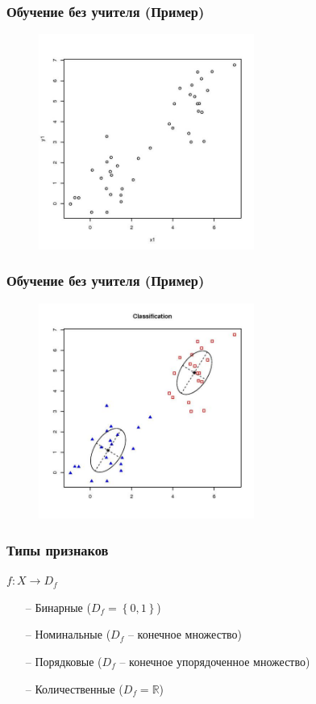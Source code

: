 \documentclass[12pt]{beamer}
\begin{document}
\begin{frame}\frametitle{Обучение без учителя (Пример) }
\begin{figure}[htbp]
\centering
\includegraphics[height=200pt]{Clustering1}  
\end{figure}
\end{frame}

\begin{frame}\frametitle{Обучение без учителя (Пример) }
\begin{figure}[htbp]
\centering
\includegraphics[height=200pt]{Clustering2}  
\end{figure}
\end{frame}

\begin{frame}\frametitle{Типы признаков}
${f: X \rightarrow D_f}$
\begin{itemize}
  \item[--] Бинарные (${D_f = \left\{ 0, 1 \right\} }$)
  \item[--] Номинальные (${D_f}$ -- конечное множество)
  \item[--] Порядковые (${D_f}$ -- конечное упорядоченное множество)
  \item[--] Количественные (${D_f = \mathbb{R} }$)
\end{itemize}
\end{frame}
\end{document}
